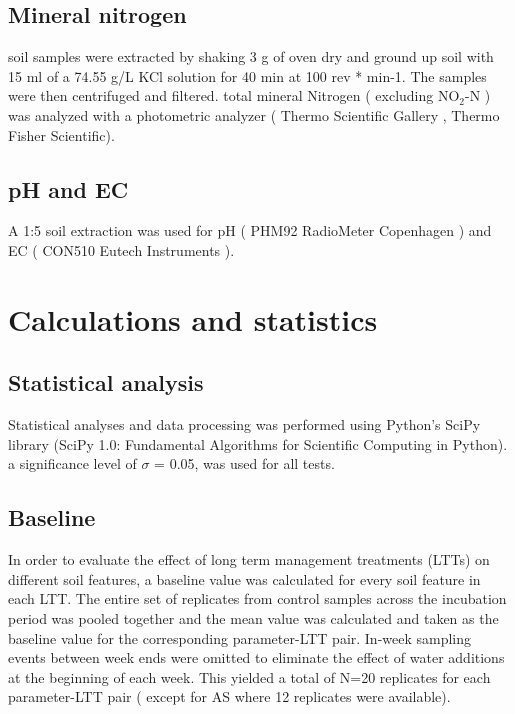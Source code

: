     \subsection{Mineral nitrogen}

    	soil samples were extracted by shaking 3 g of oven dry and ground up soil with 15 ml of a 74.55 g/L KCl solution for 40 min at 100 rev * min-1. The samples were then centrifuged and filtered. total mineral Nitrogen ( excluding NO$_2$-N ) was analyzed with a photometric analyzer ( Thermo Scientific Gallery , Thermo Fisher Scientific).

    \subsection{pH and EC}

    	A 1:5 soil extraction was used for pH ( PHM92 RadioMeter Copenhagen ) and EC ( CON510 Eutech Instruments ).


\section{Calculations and statistics}

    \subsection{Statistical analysis}

  	 Statistical analyses and data processing was performed using Python’s SciPy library (SciPy 1.0: Fundamental Algorithms for Scientific Computing in Python).  a significance level of $\sigma$  = 0.05, was used for all tests. \\

    \subsection{Baseline}

    	In order to evaluate the effect of long term management treatments (LTTs) on different soil features, a baseline value was calculated for every soil feature in each LTT. The entire set of replicates from control samples across the incubation period was pooled together and the mean value was calculated and taken as the baseline value for the corresponding parameter-LTT pair. In-week sampling events between week ends were omitted to eliminate the effect of water additions at the beginning of each week. This yielded a total of N=20 replicates for each parameter-LTT pair ( except for AS where 12 replicates were available).

